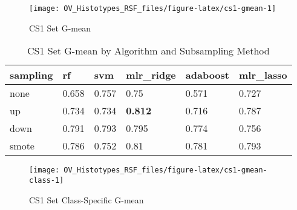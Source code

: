 \documentclass[
]{report}
\begin{document}
\begin{figure}[H]

{\centering \texttt{[image: OV\_Histotypes\_RSF\_files/figure-latex/cs1-gmean-1]} 

}

\caption{CS1 Set G-mean}\label{fig:cs1-gmean}
\end{figure}

\begin{table}

\caption{\label{tab:cs1-gmean-table}CS1 Set G-mean by Algorithm and Subsampling Method}
\centering
\begin{tabular}[t]{l|l|l|l|l|l}
\hline
sampling & rf & svm & mlr\_ridge & adaboost & mlr\_lasso\\
\hline
none & 0.658 & 0.757 & 0.75 & 0.571 & 0.727\\
\hline
up & 0.734 & 0.734 & \textbf{0.812} & 0.716 & 0.787\\
\hline
down & 0.791 & 0.793 & 0.795 & 0.774 & 0.756\\
\hline
smote & 0.786 & 0.752 & 0.81 & 0.781 & 0.793\\
\hline
\end{tabular}
\end{table}

\begin{figure}[H]

{\centering \texttt{[image: OV\_Histotypes\_RSF\_files/figure-latex/cs1-gmean-class-1]} 

}

\caption{CS1 Set Class-Specific G-mean}\label{fig:cs1-gmean-class}
\end{figure}
\end{document}
